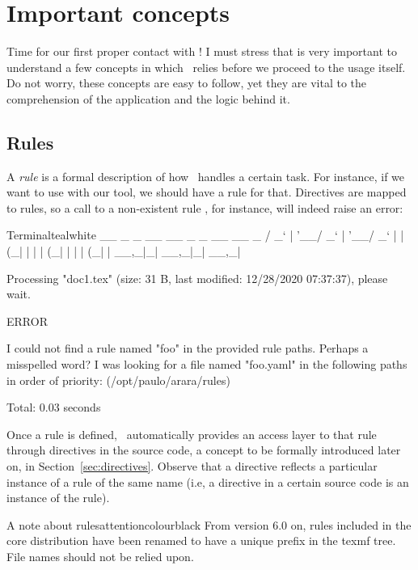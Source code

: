 \chapter{Important concepts}
\label{chap:importantconcepts}

Time for our first proper contact with \arara! I must stress that is very important to understand a few concepts in which \arara\ relies before we proceed to the usage itself. Do not worry, these concepts are easy to follow, yet they are vital to the comprehension of the application and the logic behind it.

\section{Rules}
\label{sec:rule}

A \emph{rule} is a formal description of how \arara\ handles a certain task. For instance, if we want to use  with our tool, we should have a rule for that. Directives are mapped to rules, so a call to a non-existent rule , for instance, will indeed raise an error:

\begin{codebox}{Terminal}{teal}{\icnote}{white}
  __ _ _ __ __ _ _ __ __ _
 / _` | '__/ _` | '__/ _` |
| (_| | | | (_| | | | (_| |
 \__,_|_|  \__,_|_|  \__,_|

Processing "doc1.tex" (size: 31 B, last modified: 12/28/2020
07:37:37), please wait.

  ERROR

I could not find a rule named "foo" in the provided rule paths.
Perhaps a misspelled word? I was looking for a file named
"foo.yaml" in the following paths in order of priority:
(/opt/paulo/arara/rules)

Total: 0.03 seconds
\end{codebox}

Once a rule is defined, \arara\ automatically provides an access layer to that rule through directives in the source code, a concept to be formally introduced later on, in Section~\ref{sec:directives}. Observe that a directive reflects a particular instance of a rule of the same name (i.e, a  directive in a certain source code is an instance of the  rule).

\begin{messagebox}{A note about rules}{attentioncolour}{\icattention}{black}
From version 6.0 on, rules included in the core distribution have been renamed to have a unique prefix in the texmf tree. File names should not be relied upon.
\end{messagebox}

